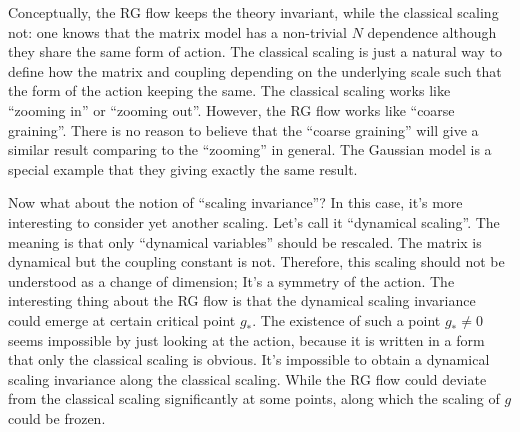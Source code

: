 Conceptually, the RG flow keeps the theory invariant, 
while the classical scaling not:
one knows that the matrix model has a non-trivial $N$ dependence 
although they share the same form of action.
The classical scaling is just a natural way to define 
how the matrix and coupling depending on the underlying scale 
such that the form of the action keeping the same.
The classical scaling works like ``zooming in'' or ``zooming out''.
However, the RG flow works like ``coarse graining''.
There is no reason to believe that the ``coarse graining'' will give a similar result comparing to the ``zooming'' in general.
The Gaussian model is a special example that they giving exactly the same result.

Now what about the notion of ``scaling invariance''?
In this case, it's more interesting to consider yet another scaling.
Let's call it ``dynamical scaling''.
The meaning is that only ``dynamical variables'' should be rescaled.
The matrix is dynamical but the coupling constant is not.
Therefore, this scaling should not be understood as a change of dimension;
It's a symmetry of the action.
The interesting thing about the RG flow is that
the dynamical scaling invariance could emerge at certain critical point $g_*$.
The existence of such a point $g_* \neq 0$ seems impossible by just looking at the action, 
because it is written in a form that only the classical scaling is obvious.
It's impossible to obtain a dynamical scaling invariance along the classical scaling.
While the RG flow could deviate from the classical scaling significantly at some points, along which the scaling of $g$ could be frozen.


